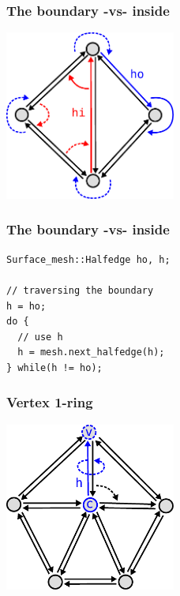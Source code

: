 \begin{frame}
\frametitle{The boundary -vs- inside}
\begin{center}
	\includegraphics[width=0.42\textwidth]{figures/halfedges-boundaries}
\end{center}
\end{frame}

\begin{frame}[fragile]
\frametitle{The boundary -vs- inside}
\begin{lstlisting}
Surface_mesh::Halfedge ho, h;

// traversing the boundary
h = ho;
do {
  // use h
  h = mesh.next_halfedge(h);
} while(h != ho);
\end{lstlisting}
\end{frame}

\begin{frame}
\frametitle{Vertex 1-ring}
\begin{center}
	\includegraphics[width=0.42\textwidth]{figures/vertex-1ring}
\end{center}
\end{frame}

